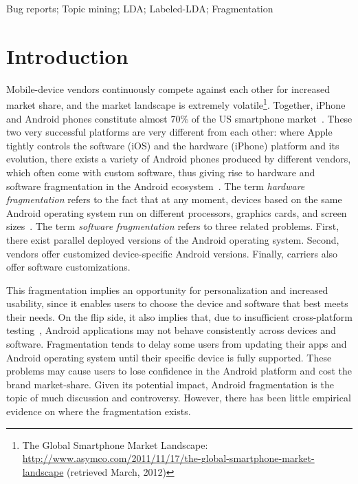 \documentclass[10pt, conference, compsocconf]{IEEEtran}
\begin{document}
\begin{IEEEkeywords}
Bug reports; Topic mining; LDA; Labeled-LDA; Fragmentation
\end{IEEEkeywords}


%
\IEEEpeerreviewmaketitle



\section{Introduction}

Mobile-device vendors continuously compete against each other for
increased market share, and the market landscape is extremely
volatile\footnote{The Global Smartphone Market Landscape:
  \url{http://www.asymco.com/2011/11/17/the-global-smartphone-market-landscape}
  (retrieved March, 2012)}. Together, iPhone and Android phones
constitute almost 70\% of the US smartphone market~\cite{usmarket}. 
These two very successful platforms are very
different from each other: where Apple tightly controls the software
(iOS) and the hardware (iPhone) platform and its evolution, there
exists a variety of Android phones produced by different vendors, which
often come with custom software, thus giving rise to hardware and
software fragmentation in the Android ecosystem~\cite{analysis}. The
term {\em hardware fragmentation} refers to the fact that at any moment, devices based on the same Android operating system run on
different processors, graphics cards, and screen
sizes~\cite{analysis}. 
The term {\em software fragmentation} refers to three
related problems. First, there exist parallel deployed versions of the Android
operating system. Second, vendors offer customized device-specific
Android versions. Finally, carriers also offer software
customizations.

This fragmentation implies an opportunity for personalization and
increased usability, since it enables users to choose the device and
software that best meets their needs. On the flip side, it also
implies that, due to insufficient cross-platform
testing~\cite{testing}, Android applications may not behave
consistently across devices and software.  
Fragmentation tends to delay some users from updating their apps
and Android operating system until their specific device is fully supported.
These problems
may cause users to lose confidence in the Android platform and cost
the brand market-share. Given its potential impact, Android
fragmentation is the topic of much discussion and
controversy. However, there has been little empirical evidence on where the fragmentation exists.
\end{document}
